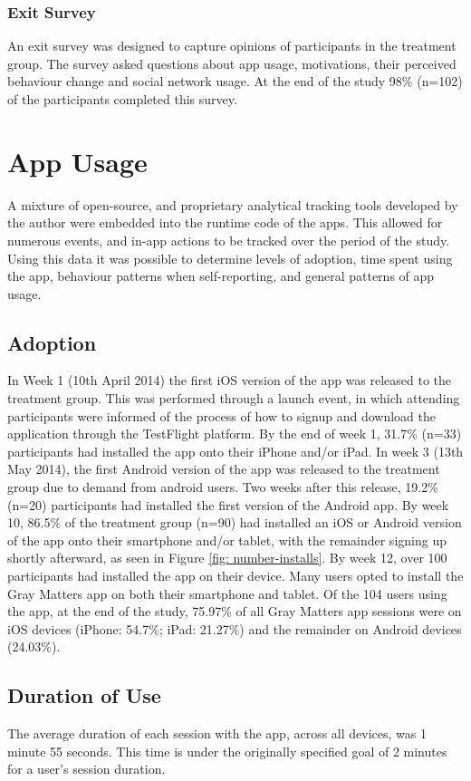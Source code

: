 \subsubsection{Exit Survey}
An exit survey was designed to capture opinions of participants in the treatment group. The survey asked questions about app usage, motivations, their perceived behaviour change and social network usage. At the end of the study 98\% (n=102) of the participants completed this survey.

\section{App Usage}
A mixture of open-source, and proprietary analytical tracking tools developed by the author were embedded into the runtime code of the apps. This allowed for numerous events, and in-app actions to be tracked over the period of the study. Using this data it was possible to determine levels of adoption, time spent using the app, behaviour patterns when self-reporting, and general patterns of app usage.

\subsection{Adoption}
In Week 1 (10th April 2014) the first iOS version of the app was released to the treatment group. This was performed through a launch event, in which attending participants were informed of the process of how to signup and download the application through the TestFlight platform. By the end of week 1, 31.7\% (n=33) participants had installed the app onto their iPhone and/or iPad. In week 3 (13th May 2014), the first Android version of the app was released to the treatment group due to demand from android users. Two weeks after this release, 19.2\% (n=20) participants had installed the first version of the Android app. By week 10, 86.5\% of the treatment group (n=90) had installed an iOS or Android version of the app onto their smartphone and/or tablet, with the remainder signing up shortly afterward, as seen in Figure \ref{fig: number-installs}. By week 12, over 100 participants had installed the app on their device. Many users opted to install the Gray Matters app on both their smartphone and tablet.
Of the 104 users using the app, at the end of the study, 75.97\% of all Gray Matters app sessions were on iOS devices (iPhone: 54.7\%; iPad: 21.27\%) and the remainder on Android devices (24.03\%).

\subsection{Duration of Use}
The average duration of each session with the app, across all devices, was 1 minute 55 seconds. This time is under the originally specified goal of 2 minutes for a user's session duration.

